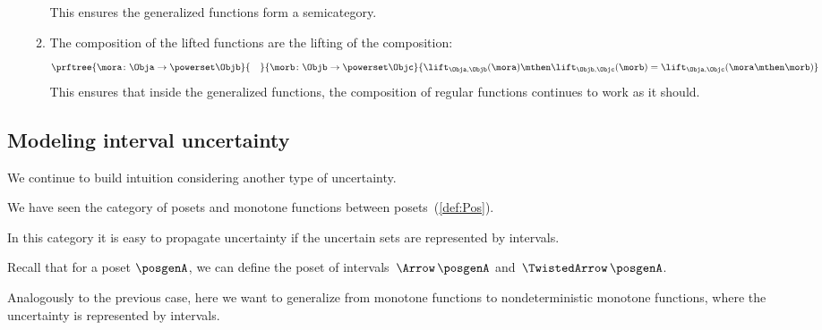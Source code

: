 \begin{itemize}
\begin{enumerate}
                    This ensures the generalized functions form a semicategory.
              \item The composition of the lifted functions are the lifting of the composition:
                    \begin{equation}
                        \label{eq:monad-fish-associative}
                        \prftree{\mora\colon \Obja \to \powerset\Objb}{\quad}{\morb\colon \Objb \to \powerset \Objc}{
                            \lift_{\Obja,\Objb}(\mora)\mthen\lift_{\Objb,\Objc}(\morb) =  \lift_{\Obja,\Objc}(\mora\mthen\morb)}
                    \end{equation}
                    This ensures that inside the generalized functions, the composition of regular functions continues to work as it should.
          \end{enumerate}
\end{itemize}

\subsection{Modeling interval uncertainty}

We continue to build intuition considering another type of uncertainty.

We have seen the category \Pos of posets and monotone functions between posets~(\cref{def:Pos}).

In this category it is easy to propagate uncertainty if the uncertain sets are represented by intervals.

Recall that for a poset $\posgenA$, we can define the poset of intervals~$\Arrow\,\posgenA$
and~$\TwistedArrow\,\posgenA$.

Analogously to the previous case, here we want to generalize from monotone functions to nondeterministic monotone functions, where the uncertainty is represented by intervals.

